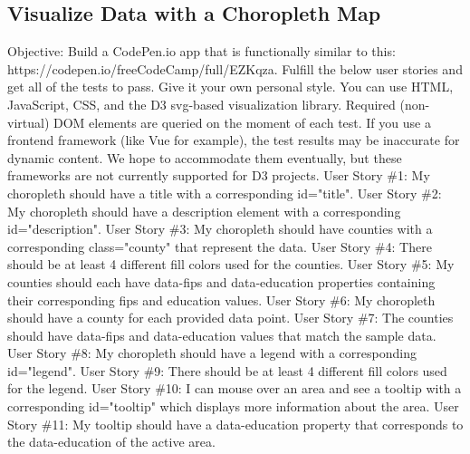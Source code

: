 \documentclass{article}%
\begin{document}
\subsection{Visualize Data with a Choropleth Map}%
\label{subsec:VisualizeDatawithaChoroplethMap}%
Objective: Build a CodePen.io app that is functionally similar to this: https://codepen.io/freeCodeCamp/full/EZKqza.\newline%
Fulfill the below user stories and get all of the tests to pass. Give it your own personal style.\newline%
You can use HTML, JavaScript, CSS, and the D3 svg{-}based visualization library. Required (non{-}virtual) DOM elements are queried on the moment of each test. If you use a frontend framework (like Vue for example), the test results may be inaccurate for dynamic content. We hope to accommodate them eventually, but these frameworks are not currently supported for D3 projects.\newline%
User Story \#1: My choropleth should have a title with a corresponding id="title".\newline%
User Story \#2: My choropleth should have a description element with a corresponding id="description".\newline%
User Story \#3: My choropleth should have counties with a corresponding class="county" that represent the data.\newline%
User Story \#4: There should be at least 4 different fill colors used for the counties.\newline%
User Story \#5: My counties should each have data{-}fips and data{-}education properties containing their corresponding fips and education values.\newline%
User Story \#6: My choropleth should have a county for each provided data point.\newline%
User Story \#7: The counties should have data{-}fips and data{-}education values that match the sample data.\newline%
User Story \#8: My choropleth should have a legend with a corresponding id="legend".\newline%
User Story \#9: There should be at least 4 different fill colors used for the legend.\newline%
User Story \#10: I can mouse over an area and see a tooltip with a corresponding id="tooltip" which displays more information about the area.\newline%
User Story \#11: My tooltip should have a data{-}education property that corresponds to the data{-}education of the active area.\newline%
\end{document}
